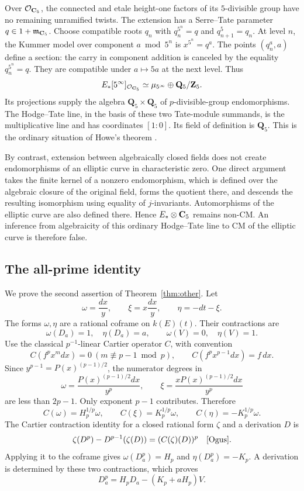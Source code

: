 \documentclass[11pt]{article}
\theoremstyle{definition}\newtheorem{definition}[theorem]{Definition}
\theoremstyle{remark}\newtheorem{remark}[theorem]{Remark}
\newcommand{\Q}{\mathbf Q}\newcommand{\Z}{\mathbf Z}
\begin{document}
Over $\mathcal O_{\mathbf C_5}$, the connected and etale height-one factors of its $5$-divisible group have no remaining unramified twists. The extension has a Serre--Tate parameter $q\in1+\mathfrak m_{\mathbf C_5}$. Choose compatible roots $q_n$ with $q_n^{5^n}=q$ and $q_{n+1}^5=q_n$. At level $n$, the Kummer model over component $a\bmod 5^n$ is $x^{5^n}=q^a$. The points $(q_n^a,a)$ define a section: the carry in component addition is canceled by the equality $q_n^{5^n}=q$. They are compatible under $a\mapsto5a$ at the next level. Thus
\[
 E_*[5^\infty]_{\mathcal O_{\C_5}}\simeq
                   \mu_{5^\infty}\oplus\Q_5/\Z_5.
\]
Its projections supply the algebra $\Q_5\times\Q_5$ of $p$-divisible-group endomorphisms. The Hodge--Tate line, in the basis of these two Tate-module summands, is the multiplicative line and has coordinates $[1:0]$. Its field of definition is $\Q_5$. This is the ordinary situation of Howe's theorem \cite[pp.~672--673]{Howe}.

By contrast, extension between algebraically closed fields does not create endomorphisms of an elliptic curve in characteristic zero. One direct argument takes the finite kernel of a nonzero endomorphism, which is defined over the algebraic closure of the original field, forms the quotient there, and descends the resulting isomorphism using equality of $j$-invariants. Automorphisms of the elliptic curve are also defined there. Hence $E_*\otimes\mathbf C_5$ remains non-CM. An inference from algebraicity of this ordinary Hodge--Tate line to CM of the elliptic curve is therefore false.

\subsection{The all-prime identity}
We prove the second assertion of Theorem~\ref{thm:other}. Let
\[
              \omega=\frac{dx}{y},\qquad
              \xi=x\frac{dx}{y},\qquad \eta=-dt-\xi.
\]
The forms $\omega,\eta$ are a rational coframe on $k(E)(t)$. Their contractions are
\[
 \omega(D_a)=1,\quad\eta(D_a)=a,
 \qquad\omega(V)=0,\quad\eta(V)=1.
\]
Use the classical $p^{-1}$-linear Cartier operator $C$, with convention
\[
 C(f^px^m dx)=0\ (m\not\equiv p-1\bmod p),\qquad
 C(f^px^{p-1}dx)=f\,dx.
\]
Since $y^{p-1}=P(x)^{(p-1)/2}$, the numerator degrees in
\[
 \omega=\frac{P(x)^{(p-1)/2}dx}{y^p},\qquad
 \xi=\frac{xP(x)^{(p-1)/2}dx}{y^p}
\]
are less than $2p-1$. Only exponent $p-1$ contributes. Therefore
\[
 C(\omega)=H_p^{1/p}\omega,\qquad
 C(\xi)=K_p^{1/p}\omega,\qquad C(\eta)=-K_p^{1/p}\omega.
\]
The Cartier contraction identity for a closed rational form $\zeta$ and a derivation $D$ is
\[
 \zeta(D^p)-D^{p-1}(\zeta(D))=(C(\zeta)(D))^p
 \quad\text{\cite[eq.~(1.2.4.5), p.~24]{Ogus}}.
\]
Applying it to the coframe gives $\omega(D_a^p)=H_p$ and $\eta(D_a^p)=-K_p$. A derivation is determined by these two contractions, which proves
\[
                   D_a^p=H_pD_a-(K_p+aH_p)V.
\]
\end{document}
